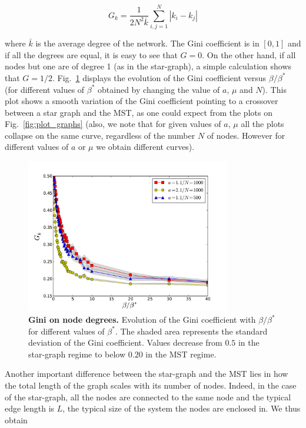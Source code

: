 \begin{equation}
    G_k = \frac{1}{2 N^2 \bar{k}} \sum_{i,j=1}^{N} | k_i - k_j |
    \label{eq:gini}
\end{equation}

where $\bar{k}$ is the average degree of the network. The Gini coefficient is in
$[0,1]$ and if all the degrees are equal, it is easy to see that $G=0$. On the
other hand, if all nodes but one are of degree 1 (as in the star-graph), a
simple calculation shows that $G=1/2$. Fig.~\ref{fig:gini} displays the
evolution of the Gini coefficient versus $\beta/\beta^*$ (for different values
of $\beta^*$ obtained by changing the value of $a$, $\mu$ and $N$). This plot
shows a smooth variation of the Gini coefficient pointing to a crossover between
a star graph and the MST,  as one could expect from the plots on
Fig.~\ref{fig:plot_graphs} (also, we note that for given values of $a$, $\mu$
all the plots collapse on the same curve, regardless of the number $N$ of nodes.
However for different values of $a$ or $\mu$ we obtain different curves).

\begin{figure}
    \centering
    \includegraphics[width=0.8\textwidth]{gfx/chapter-networks/figure2.pdf}
    \caption{{\bf Gini on node degrees.} Evolution of the Gini coefficient with
$\beta/\beta^*$ for different values of $\beta^*$. The shaded area represents
the standard deviation of the Gini coefficient. Values decrease from $0.5$ in
the star-graph regime to below $0.20$ in the MST regime.\label{fig:gini}} \end{figure}

Another important difference between the star-graph and the MST lies in how the
total length of the graph scales with its number of nodes. Indeed, in the case
of the star-graph, all the nodes are connected to the same node and the typical
edge length is $L$, the typical size of the system the nodes are enclosed in. We
thus obtain

